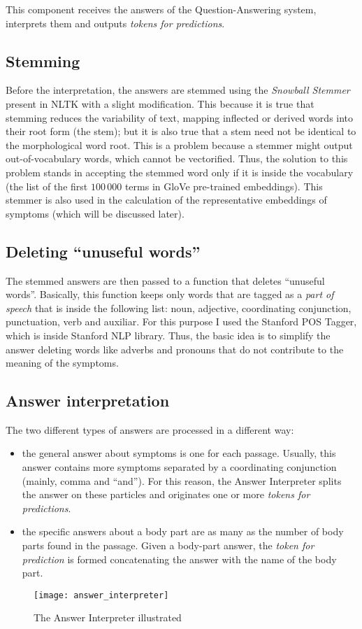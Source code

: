 This component receives the answers of the Question-Answering system, interprets them and outputs \textit{tokens for predictions}.
\subsection{Stemming}
\label{sec:stemming}
Before the interpretation, the answers are stemmed using the \textit{Snowball Stemmer} present in NLTK with a slight modification. This because it is true that stemming reduces the variability of text, mapping inflected or derived words into their root form (the stem); but it is also true that a stem need not be identical to the morphological word root. This is a problem because a stemmer might output out-of-vocabulary words, which cannot be vectorified. Thus, the solution to this problem stands in accepting the stemmed word only if it is inside the vocabulary (the list of the first $100\,000$ terms in GloVe pre-trained embeddings). This stemmer is also used in the calculation of the representative embeddings of symptoms (which will be discussed later).

\subsection{Deleting ``unuseful words''}
The stemmed answers are then passed to a function that deletes ``unuseful words''. Basically, this function keeps only words that are tagged as a \textit{part of speech} that is inside the following list: noun, adjective, coordinating conjunction, punctuation, verb and auxiliar. For this purpose I used the Stanford POS Tagger, which is inside Stanford NLP library. Thus, the basic idea is to simplify the answer deleting words like adverbs and pronouns that do not contribute to the meaning of the symptoms.

\subsection{Answer interpretation}
The two different types of answers are processed in a different way:
\begin{itemize}
  \item the general answer about symptoms is one for each passage. Usually, this answer contains more symptoms separated by a coordinating conjunction (mainly, comma and ``and''). For this reason, the Answer Interpreter splits the answer on these particles and originates one or more \textit{tokens for predictions}.
  \item the specific answers about a body part are as many as the number of body parts found in the passage. Given a body-part answer, the \textit{token for prediction} is formed concatenating the answer with the name of the body part.
\end{itemize}

\begin{figure}[h]
\centering
\texttt{[image: answer\_interpreter]}
\caption{The Answer Interpreter illustrated}
\medskip
\label{fig:answer_int}
\end{figure}
